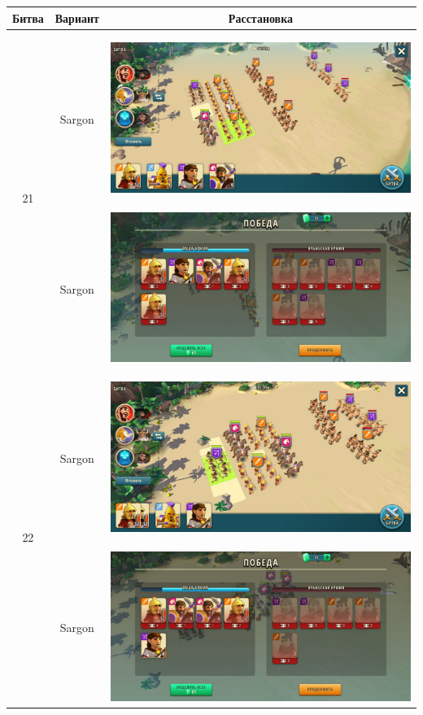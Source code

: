 \noindent
\begin{longtable}{|c|c|c|}
	\hline
	Битва & Вариант & Расстановка \\\hline\endhead
	\multirow{2}{*}{21} & Sargon &
	\hypertarget{fight21}{\includegraphics[width=0.75\linewidth]{./parts/media/TreasureHunt/21/sargon/photo_2022-04-06_18-11-33.jpg}} \\
	& Sargon &
	\includegraphics[width=0.75\linewidth]{./parts/media/TreasureHunt/21/sargon/photo_2022-04-06_18-11-59.jpg} \\
	\hline
	\multirow{6}{*}{22} & Sargon &
	\hypertarget{fight22}{\includegraphics[width=0.75\linewidth]{./parts/media/TreasureHunt/22/sargon/photo_2022-04-06_18-12-03.jpg}} \\
	& Sargon &
	\includegraphics[width=0.75\linewidth]{./parts/media/TreasureHunt/22/sargon/photo_2022-04-06_18-12-13.jpg} \\

\end{longtable}
